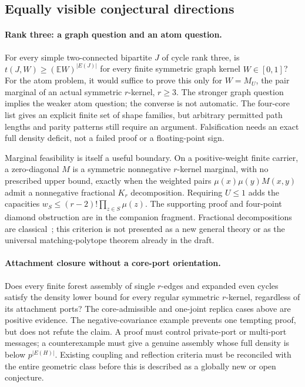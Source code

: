 \subsection{Equally visible conjectural directions}

\paragraph{Rank three: a graph question and an atom question.}
For every simple two-connected bipartite $J$ of cycle rank three, is
$t(J,W)\ge(\mathbb EW)^{|E(J)|}$ for every finite symmetric graph kernel
$W\in[0,1]$?  For the atom problem, it would suffice to prove this only
for $W=M_U$, the pair marginal of an actual symmetric $r$-kernel,
$r\ge3$.  The stronger graph question implies the weaker atom question;
the converse is not automatic.  The four-core list gives an explicit
finite set of shape families, but arbitrary permitted path lengths and
parity patterns still require an argument.  Falsification needs an
exact full density deficit, not a failed proof or a floating-point sign.

Marginal feasibility is itself a useful boundary.  On a positive-weight
finite carrier, a zero-diagonal $M$ is a symmetric nonnegative $r$-kernel
marginal, with no prescribed upper bound, exactly when the weighted pairs
$\mu(x)\mu(y)M(x,y)$ admit a nonnegative fractional $K_r$ decomposition.
Requiring $U\le1$ adds the capacities
$w_S\le(r-2)!\prod_{z\in S}\mu(z)$.  The supporting proof and four-point diamond
obstruction are in the companion fragment.  Fractional decompositions
are classical~\citep{dross2016}; this criterion is not presented as a
new general theory or as the universal matching-polytope theorem
already in the draft.

\paragraph{Attachment closure without a core-port orientation.}
Does every finite forest assembly of single $r$-edges and expanded
even cycles satisfy the density lower bound for every regular
symmetric $r$-kernel, regardless of its attachment ports?  The
core-admissible and one-joint replica cases above are positive evidence.
The negative-covariance example prevents one tempting proof, but does
not refute the claim.  A proof must control private-port or multi-port
messages; a counterexample must give a genuine assembly whose full
density is below $p^{|E(H)|}$.  Existing coupling and reflection
criteria must be reconciled with the entire geometric class before
this is described as a globally new or open conjecture.

